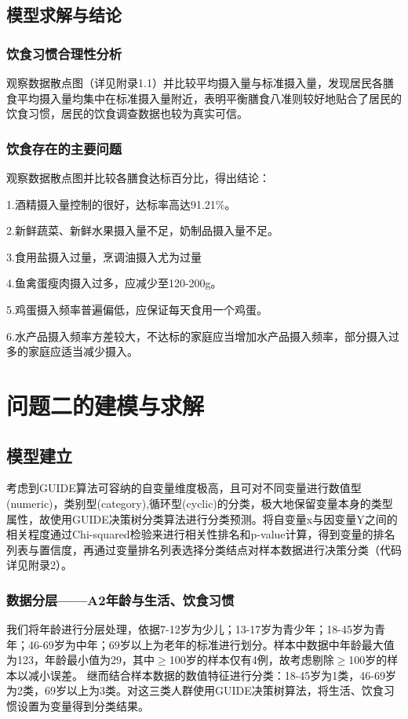 \documentclass{article}
\numberwithin{equation}{subsection}
\begin{document}
\subsection{模型求解与结论}
\subsubsection{饮食习惯合理性分析}
观察数据散点图（详见附录1.1）并比较平均摄入量与标准摄入量，发现居民各膳食平均摄入量均集中在标准摄入量附近，表明平衡膳食八准则较好地贴合了居民的饮食习惯，居民的饮食调查数据也较为真实可信。

\subsubsection{饮食存在的主要问题}
观察数据散点图并比较各膳食达标百分比，得出结论：

1.酒精摄入量控制的很好，达标率高达91.21\%。

2.新鲜蔬菜、新鲜水果摄入量不足，奶制品摄入量不足。

3.食用盐摄入过量，烹调油摄入尤为过量

4.鱼禽蛋瘦肉摄入过多，应减少至120-200g。

5.鸡蛋摄入频率普遍偏低，应保证每天食用一个鸡蛋。

6.水产品摄入频率方差较大，不达标的家庭应当增加水产品摄入频率，部分摄入过多的家庭应适当减少摄入。



{\centering\section{问题二的建模与求解}}
\subsection{模型建立}
考虑到GUIDE算法可容纳的自变量维度极高，且可对不同变量进行数值型(numeric)，类别型(category),循环型(cyclic)的分类，极大地保留变量本身的类型属性，故使用GUIDE决策树分类算法进行分类预测。将自变量x与因变量Y之间的相关程度通过Chi-squared检验来进行相关性排名和p-value计算，得到变量的排名列表与置信度，再通过变量排名列表选择分类结点对样本数据进行决策分类（代码详见附录2）。
\subsubsection{数据分层——A2年龄与生活、饮食习惯}
我们将年龄进行分层处理，依据7-12岁为少儿；13-17岁为青少年；18-45岁为青年；46-69岁为中年；69岁以上为老年的标准进行划分。样本中数据中年龄最大值为123，年龄最小值为29，其中$\geq$100岁的样本仅有4例，故考虑剔除$\geq$100岁的样本以减小误差。
继而结合样本数据的数值特征进行分类：18-45岁为1类，46-69岁为2类，69岁以上为3类。对这三类人群使用GUIDE决策树算法，将生活、饮食习惯设置为变量得到分类结果。
\end{document}
